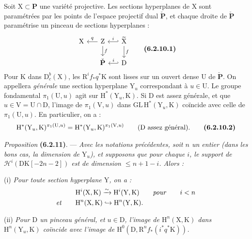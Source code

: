\documentclass[11pt,leqno]{article}
\begin{document}
Soit \(\mathrm{X}\subset\mathbf{P}\) une variété projective. Les sections hyperplanes de \(\mathrm{X}\) sont paramétrées par les points de l’espace projectif dual \(\check{\mathbf{P}}\), et chaque droite de \(\check{\mathbf{P}}\) paramétrise un pinceau de sections hyperplanes :
\[
\begin{tikzcd}[column sep=1.5em, row sep=1.5em]
\mathrm{X}
& \mathrm{Z} \arrow[l, "q"'] \arrow[d, "f"]
& \widetilde{\mathrm{X}} \arrow[l, hook', "i"'] \arrow[d, "f"] \\
& \check{\mathbf{P}}
& \mathrm{D} \arrow[l, hook', "i"']
\end{tikzcd}
\tag*{\textbf{(6.2.10.1)}}
\]
Pour \(\mathrm{K}\) dans \(\mathrm{D}_c^b(\mathrm{X})\), les \(\mathrm{R}^if_*q^*\mathrm{K}\) sont lisses sur un ouvert dense \(\mathrm{U}\) de \(\check{\mathbf{P}}\). On appellera \textit{générale} une section hyperplane \(\mathrm{Y}_u\) correspondant à \(u\in\mathrm{U}\). Le groupe fondamental \(\pi_1(\mathrm{U},u)\) agit sur \(\mathrm{H}^*(\mathrm{Y}_u,\mathrm{K})\). Si \(\mathrm{D}\) est assez générale, et que \(u\in\mathrm{V}=\mathrm{U}\cap\mathrm{D}\), l’image de \(\pi_1(\mathrm{V},u)\) dans \(\mathrm{GL}\,\mathrm{H}^*(\mathrm{Y}_u,\mathrm{K})\) coïncide avec celle de \(\pi_1(\mathrm{U},u)\). En particulier, on a :
\[
\mathrm{H}^*(\mathrm{Y}_u,\mathrm{K})^{\pi_1(\mathrm{U},u)}
=
\mathrm{H}^*(\mathrm{Y}_u,\mathrm{K})^{\pi_1(\mathrm{V},u)}
\qquad
\text{(\(\mathrm{D}\) assez général).}
\tag*{\textbf{(6.2.10.2)}}
\]

\medskip
\textit{Proposition} \textbf{(6.2.11)}. — \textit{Avec les notations précédentes, soit \(n\) un entier (dans les bons cas, la dimension de \(\mathrm{Y}_u\)), et supposons que pour chaque \(i\), le support de \(\mathscr{H}^i(\mathrm{DK}[-2n-2])\) est de dimension \(\leq n+1-i\). Alors :}

(i) \textit{Pour toute section hyperplane \(\mathrm{Y}\), on a :}
\begin{align*}
& \mathrm{H}^i(\mathrm{X},\mathrm{K})
  \xrightarrow{\sim}
  \mathrm{H}^i(\mathrm{Y},\mathrm{K})
  \qquad \text{\textit{pour}} \qquad i<n \\
\text{\textit{et}}\qquad
& \mathrm{H}^n(\mathrm{X},\mathrm{K})
  \hookrightarrow
  \mathrm{H}^n(\mathrm{Y},\mathrm{K}).
\end{align*}

(ii) \textit{Pour \(\mathrm{D}\) un pinceau général, et \(u\in\mathrm{D}\), l’image de \(\mathrm{H}^n(\mathrm{X},\mathrm{K})\) dans \(\mathrm{H}^n(\mathrm{Y}_u,\mathrm{K})\) coïncide avec l’image de \(\mathrm{H}^0(\mathrm{D},\mathrm{R}^nf_*(i^*q^*\mathrm{K}))\).}
\end{document}
